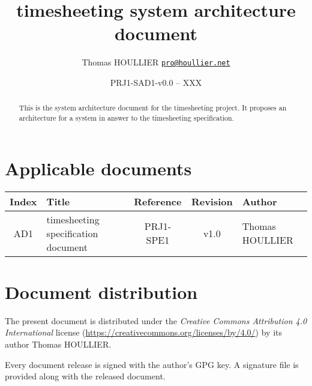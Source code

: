 \documentclass[letterpaper]{article}
\title{timesheeting system architecture document}
\author{Thomas HOULLIER \href{mailto:pro@houllier.net}
         {\texttt{\textlangle pro@houllier.net\textrangle}}}
\begin{document}
\frenchspacing
\date{PRJ1-SAD1-v0.0 -- XXX}
\maketitle
\thispagestyle{FirstPage}

\begin{abstract}
  This is the system architecture document for the timesheeting project.
  It proposes an architecture for a system in answer to the timesheeting
  specification.
\end{abstract}

\begin{versionhistory}
\end{versionhistory}
\setcounter{table}{0} %

\section*{Applicable documents}
{ \centering
\begin{tabularx}{\textwidth}{| c | X | c | c | X |} \hline
  Index & Title & Reference & Revision & Author \\ \hline
  AD1   & timesheeting specification document & PRJ1-SPE1 & v1.0 & Thomas HOULLIER \\
  \hline \end{tabularx} \par }

\section*{Document distribution}
The present document is distributed under the \emph{Creative Commons Attribution
4.0 International} license (\url{https://creativecommons.org/licenses/by/4.0/})
by its author Thomas HOULLIER.

Every document release is signed with the author's GPG key. A signature file
is provided along with the released document.

\tableofcontents
\printglossary[type=\acronymtype,style=index]
\pagestyle{plain}




\appendix


\apptocmd{\thebibliography}{\raggedright}{}{}
\begingroup
{}
\setlength\bibitemsep{0pt}
\printbibliography
\endgroup
\end{document}
